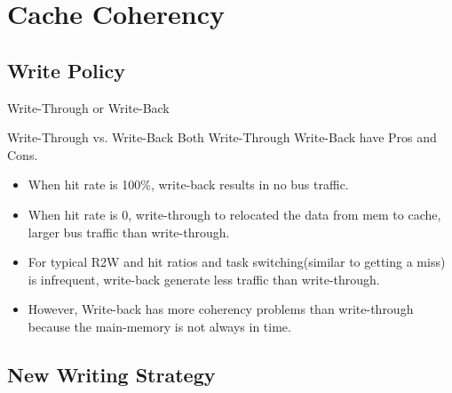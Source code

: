 \documentclass{beamer}
\begin{document}
\section{Cache Coherency}

\subsection{Write Policy}
\begin{frame}{Write-Through or Write-Back}
	\begin{block}{Write-Through vs. Write-Back}
		Both Write-Through Write-Back have Pros and Cons.
	\end{block}
		
	\begin{itemize}
		\item {
			When hit rate is 100\%, write-back results in no bus traffic. }
		\item {When hit rate is 0, write-through to relocated the data from mem to cache, larger bus traffic than write-through.}
		\item{
			For typical R2W and hit ratios and task switching(similar to getting a miss) is infrequent, write-back generate less traffic than write-through.
		}
		\item{
			However, Write-back has more coherency problems than write-through because the main-memory is not always in time. 
		}
	\end{itemize}
\end{frame}

\subsection{New Writing Strategy}
\end{document}
